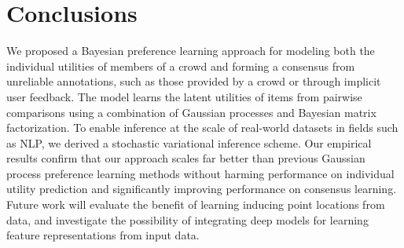 \section{Conclusions}

We proposed a Bayesian preference learning approach 
for modeling both the individual utilities of members of a crowd 
and forming a consensus from 
unreliable annotations, such as those provided by a crowd or through implicit user feedback.
The model learns the latent utilities of items from pairwise comparisons using a combination of Gaussian processes and Bayesian matrix factorization.
To enable inference at the scale of real-world datasets in fields such as NLP,
we derived a stochastic variational inference scheme.
Our empirical results confirm that our approach scales far better than previous
Gaussian process preference learning methods without harming  
performance on individual utility prediction and significantly improving performance
on consensus learning.
Future work will evaluate the benefit of learning inducing point locations from data,
and investigate the possibility of integrating deep models 
for learning feature representations from input data.
